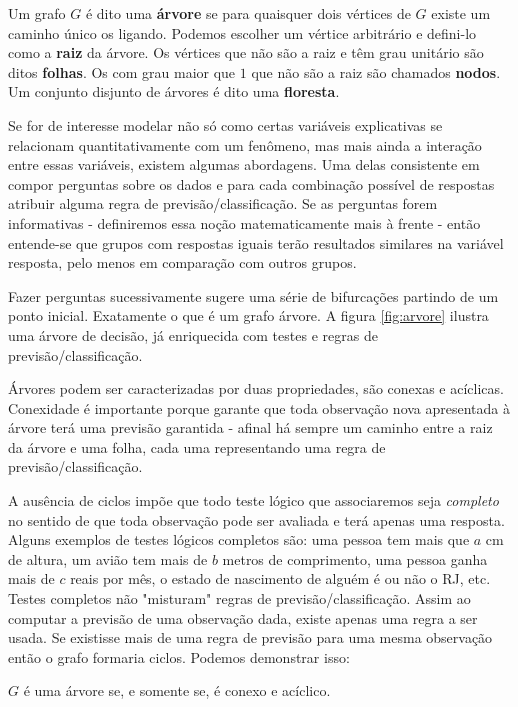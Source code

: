 \begin{defi}[Árvores]
Um grafo $G$ é dito uma \textbf{árvore} se para quaisquer dois vértices de $G$ existe um caminho único os ligando. Podemos escolher um vértice arbitrário e defini-lo como a \textbf{raiz} da árvore. Os vértices que não são a raiz e têm grau unitário são ditos \textbf{folhas}. Os com grau maior que $1$ que não são a raiz são chamados \textbf{nodos}. Um conjunto disjunto de árvores é dito uma \textbf{floresta}.
\end{defi}

Se for de interesse modelar não só como certas variáveis explicativas se relacionam quantitativamente com um fenômeno, mas mais ainda a interação entre essas variáveis, existem algumas abordagens. Uma delas consistente em compor perguntas sobre os dados e para cada combinação possível de respostas atribuir alguma regra de previsão/classificação. Se as perguntas forem informativas - definiremos essa noção matematicamente mais à frente - então entende-se que grupos com respostas iguais terão resultados similares na variável resposta, pelo menos em comparação com outros grupos. 

Fazer perguntas sucessivamente sugere uma série de bifurcações partindo de um ponto inicial. Exatamente o que é um grafo árvore. A figura \ref{fig:arvore} ilustra uma árvore de decisão, já enriquecida com testes e regras de previsão/classificação. 

Árvores podem ser caracterizadas por duas propriedades, são conexas e acíclicas. Conexidade é importante porque garante que toda observação nova apresentada à árvore terá uma previsão garantida - afinal há sempre um caminho entre a raiz da árvore e uma folha, cada uma representando uma regra de previsão/classificação.

A ausência de ciclos impõe que todo teste lógico que associaremos seja \textit{completo} no sentido de que toda observação pode ser avaliada e terá apenas uma resposta. Alguns exemplos de testes lógicos completos são: uma pessoa tem mais que $a$ cm de altura, um avião tem mais de $b$ metros de comprimento, uma pessoa ganha mais de $c$ reais por mês, o estado de nascimento de alguém é ou não o RJ, etc. Testes completos não "misturam" regras de previsão/classificação. Assim ao computar a previsão de uma observação dada, existe apenas uma regra a ser usada. Se existisse mais de uma regra de previsão para uma mesma observação então o grafo formaria ciclos. Podemos demonstrar isso:

\begin{teo}
$G$ é uma árvore se, e somente se, é conexo e acíclico.
\end{teo}

